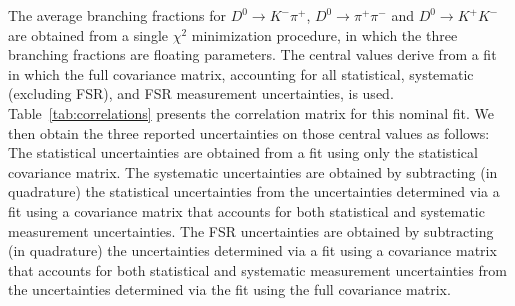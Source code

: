 
The average branching fractions for 
$D^0\to K^-\pi^+$, $D^0\to \pi^+\pi^-$ and $D^0\to K^+ K^-$ 
are obtained from a single $\chi^2$ minimization procedure, 
in which the three branching fractions are floating parameters. 
The central values derive from a fit in which the full covariance matrix, 
accounting for all statistical, systematic (excluding FSR), and FSR measurement uncertainties, is used.  
Table~\ref{tab:correlations} presents the correlation matrix for 
this nominal fit. %
We then obtain the three reported uncertainties on those central values as follows:
The statistical uncertainties are obtained from a fit using only the statistical covariance matrix.  
The systematic uncertainties are obtained by subtracting (in quadrature) the statistical uncertainties 
from the uncertainties determined via a fit using a covariance matrix that accounts for both statistical and systematic measurement uncertainties.  
The FSR uncertainties are obtained by subtracting (in quadrature)
the uncertainties determined via a fit using a covariance matrix that accounts for both statistical and systematic measurement uncertainties
from the uncertainties determined via the fit using the full covariance matrix.

